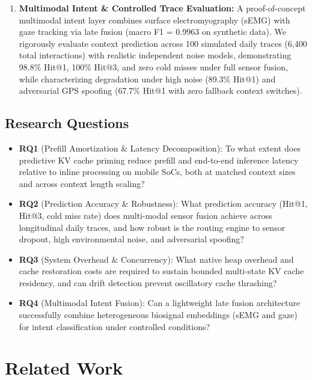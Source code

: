 \documentclass[journal]{IEEEtran}
\begin{document}
\begin{enumerate}
    \item \textbf{Multimodal Intent \& Controlled Trace Evaluation:} A proof-of-concept multimodal intent layer combines surface electromyography (sEMG) with gaze tracking via late fusion (macro F1 = 0.9963 on synthetic data). We rigorously evaluate context prediction across 100 simulated daily traces (6,400 total interactions) with realistic independent noise models, demonstrating 98.8\% Hit@1, 100\% Hit@3, and zero cold misses under full sensor fusion, while characterizing degradation under high noise (89.3\% Hit@1) and adversarial GPS spoofing (67.7\% Hit@1 with zero fallback context switches).
\end{enumerate}

\subsection{Research Questions}
\label{sec:rqs}

\begin{itemize}
    \item \textbf{RQ1} (Prefill Amortization \& Latency Decomposition): To what extent does predictive KV cache priming reduce prefill and end-to-end inference latency relative to inline processing on mobile SoCs, both at matched context sizes and across context length scaling?
    \item \textbf{RQ2} (Prediction Accuracy \& Robustness): What prediction accuracy (Hit@1, Hit@3, cold miss rate) does multi-modal sensor fusion achieve across longitudinal daily traces, and how robust is the routing engine to sensor dropout, high environmental noise, and adversarial spoofing?
    \item \textbf{RQ3} (System Overhead \& Concurrency): What native heap overhead and cache restoration costs are required to sustain bounded multi-state KV cache residency, and can drift detection prevent oscillatory cache thrashing?
    \item \textbf{RQ4} (Multimodal Intent Fusion): Can a lightweight late fusion architecture successfully combine heterogeneous biosignal embeddings (sEMG and gaze) for intent classification under controlled conditions?
\end{itemize}

\section{Related Work}
\label{sec:related}
\end{document}
